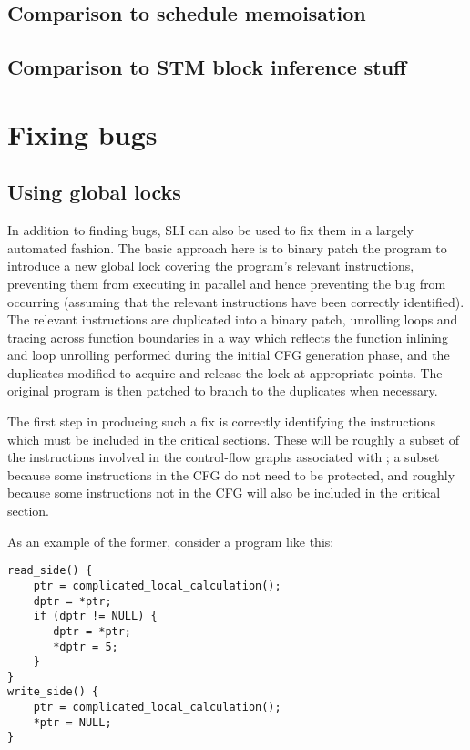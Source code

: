 \subsection{Comparison to schedule memoisation}
\subsection{Comparison to STM block inference stuff}

\section{Fixing bugs}

\subsection{Using global locks}
\label{sect:fix_global_lock}

In addition to finding bugs, SLI can also be used to fix them in a
largely automated fashion.  The basic approach here is to binary patch
the program to introduce a new global lock covering the program's
relevant instructions, preventing them from executing in parallel and
hence preventing the bug from occurring (assuming that the relevant
instructions have been correctly identified).  The relevant
instructions are duplicated into a binary patch, unrolling loops and
tracing across function boundaries in a way which reflects the
function inlining and loop unrolling performed during the initial CFG
generation phase, and the duplicates modified to acquire and release
the lock at appropriate points.  The original program is then patched
to branch to the duplicates when necessary.

The first step in producing such a fix is correctly identifying the
instructions which must be included in the critical sections.  These
will be roughly a subset of the instructions involved in the
control-flow graphs associated with \StateMachines; a subset because
some instructions in the CFG do not need to be protected, and roughly
because some instructions not in the CFG will also be included in the
critical section.

As an example of the former, consider a program like this:

\begin{verbatim}
read_side() {
    ptr = complicated_local_calculation();
    dptr = *ptr;
    if (dptr != NULL) {
       dptr = *ptr;
       *dptr = 5;
    }
}
write_side() {
    ptr = complicated_local_calculation();
    *ptr = NULL;
}
\end{verbatim}

